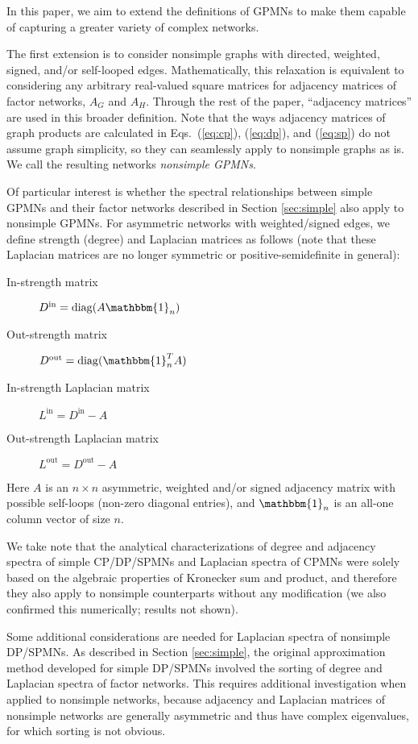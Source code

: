 \documentclass{article}
\newcommand{\bone}{\mathbbm{1}}
\begin{document}
In this paper, we aim to extend the definitions of GPMNs to make them
capable of capturing a greater variety of complex networks.

The first extension is to consider nonsimple graphs with directed,
weighted, signed, and/or self-looped edges. Mathematically, this
relaxation is equivalent to considering any arbitrary real-valued
square matrices for adjacency matrices of factor networks, $A_G$ and
$A_H$. Through the rest of the paper, ``adjacency matrices'' are used
in this broader definition. Note that the ways adjacency matrices of
graph products are calculated in Eqs.~(\ref{eq:cp}), (\ref{eq:dp}),
and (\ref{eq:sp}) do not assume graph simplicity, so they can
seamlessly apply to nonsimple graphs as is. We call the resulting
networks {\em nonsimple GPMNs}.

Of particular interest is whether the spectral relationships between
simple GPMNs and their factor networks described in Section
\ref{sec:simple} also apply to nonsimple GPMNs. For asymmetric
networks with weighted/signed edges, we define strength (degree) and
Laplacian matrices as follows (note that these Laplacian matrices are
no longer symmetric or positive-semidefinite in general):
\begin{description}
\item[In-strength matrix] $D^\mathrm{in} = \mathrm{diag}(A \bone_n)$
\item[Out-strength matrix] $D^\mathrm{out} = \mathrm{diag}(\bone^T_n A)$
\item[In-strength Laplacian matrix] $L^\mathrm{in} = D^\mathrm{in} - A$
\item[Out-strength Laplacian matrix] $L^\mathrm{out} = D^\mathrm{out} - A$
\end{description}
Here $A$ is an $n \times n$ asymmetric, weighted and/or signed
adjacency matrix with possible self-loops (non-zero diagonal entries),
and $\bone_n$ is an all-one column vector of size $n$.

We take note that the analytical characterizations of degree and
adjacency spectra of simple CP/DP/SPMNs and Laplacian spectra of CPMNs
\cite{sayama2016estimation} were solely based on the algebraic
properties of Kronecker sum and product, and therefore they also apply
to nonsimple counterparts without any modification (we also confirmed
this numerically; results not shown).

Some additional considerations are needed for Laplacian spectra of
nonsimple DP/SPMNs. As described in Section \ref{sec:simple}, the
original approximation method developed for simple DP/SPMNs
\cite{sayama2016estimation} involved the sorting of degree and
Laplacian spectra of factor networks. This requires additional
investigation when applied to nonsimple networks, because adjacency
and Laplacian matrices of nonsimple networks are generally asymmetric
and thus have complex eigenvalues, for which sorting is not obvious.
\end{document}
